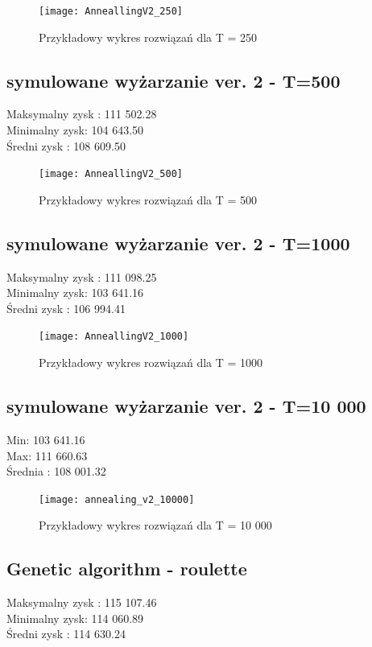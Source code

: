 \documentclass{article}
\begin{document}
\begin{figure}[H]
	\centering
	\texttt{[image: AnneallingV2\_250]}
	\caption{Przykładowy wykres rozwiązań dla T = 250}
	\label{fig:anneallingv2250}
\end{figure}


\subsection{symulowane wyżarzanie ver. 2 - T=500}
Maksymalny zysk : 111 502.28 \\
Minimalny zysk: 104 643.50 \\
Średni zysk : 108 609.50 \\

\begin{figure}[H]
	\centering
	\texttt{[image: AnneallingV2\_500]}
	\caption{Przykładowy wykres rozwiązań dla T = 500}
	\label{fig:anneallingv2500}
\end{figure}


\subsection{symulowane wyżarzanie ver. 2 - T=1000}
Maksymalny zysk : 111 098.25 \\
Minimalny zysk: 103 641.16 \\
Średni zysk : 106 994.41 \\

\begin{figure}[H]
	\centering
	\texttt{[image: AnneallingV2\_1000]}
	\caption{Przykładowy wykres rozwiązań dla T = 1000}
	\label{fig:anneallingv21000}
\end{figure}


\subsection{symulowane wyżarzanie ver. 2 - T=10 000}

Min: 103 641.16\\
Max: 111 660.63\\
Średnia : 108 001.32\\

\begin{figure}[H]
	\centering
	\texttt{[image: annealing\_v2\_10000]}
	\caption{Przykładowy wykres rozwiązań dla T = 10 000}
	\label{fig:annealingv210000}
\end{figure}


\subsection{Genetic algorithm - roulette}
Maksymalny zysk : 115 107.46 \\
Minimalny zysk: 114 060.89 \\
Średni zysk : 114 630.24\\
\end{document}
